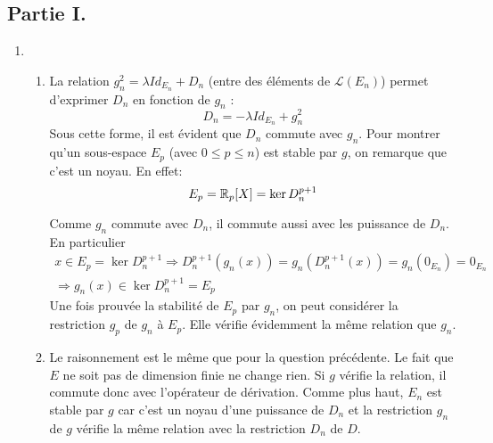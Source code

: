 \subsection*{Partie I.}
\begin{enumerate}
  \item
     \begin{enumerate}
       \item La relation  $g_n^2=\lambda Id_{E_n} +D_n$ (entre des éléments de $\mathcal{L}(E_n)$) permet d'exprimer $D_n$ en fonction de $g_n$ :
\begin{displaymath}
 D_n=-\lambda Id_{E_n} + g_n^2
\end{displaymath}
Sous cette forme, il est {\'e}vident que $D_n$ commute avec $g_n$.\newline
Pour montrer qu'un sous-espace $E_p$ (avec $0\leq p \leq n$) est stable par $g$, on remarque que c'est un noyau. En effet: 
\begin{displaymath}
  E_p = \mathbb{R}_p[X] = \ker D_n^{p+1}
\end{displaymath}

Comme $g_n$ commute avec $D_n$, il commute aussi avec les puissance de $D_n$. En particulier
\begin{multline*}
 x\in E_p = \ker D_n^{p+1} \Rightarrow D_n^{p+1}(g_n(x))= g_n( D_n^{p+1}(x)) = g_n(0_{E_n}) = 0_{E_n}\\
 \Rightarrow g_n(x) \in \ker D_n^{p+1} = E_p
\end{multline*}
Une fois prouv{\'e}e la stabilit{\'e} de $E_p$ par $g_n$, on peut consid{\'e}rer la restriction $g_p$ de $g_n$ {\`a} $E_p$. Elle v{\'e}rifie {\'e}videmment la m{\^e}me relation que $g_n$.

 \item Le raisonnement est le m{\^e}me que pour la question pr{\'e}c{\'e}dente. Le fait que $E$ ne soit pas de dimension finie ne change rien. Si $g$ v{\'e}rifie la relation, il commute donc avec l'op{\'e}rateur de d{\'e}rivation.\newline
Comme plus haut, $E_n$ est stable par $g$ car c'est un noyau d'une puissance de $D_n$ et la restriction $g_n$ de $g$ v{\'e}rifie la m{\^e}me relation avec la restriction $D_n$ de $D$.
    \end{enumerate}
    

\end{enumerate}

